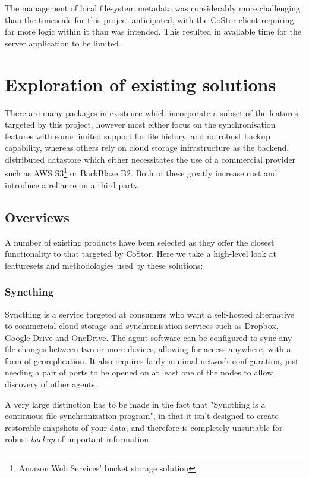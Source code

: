 \documentclass[bsc,frontabs,twoside,singlespacing,parskip,deptreport]{infthesis}     %
\begin{document}
The management of local filesystem metadata was considerably more challenging than the timescale
for this project anticipated, with the CoStor client requiring far more logic within it than was
intended. This resulted in available time for the server application to be limited.

\clearpage

\section{Exploration of existing solutions}

There are many packages in existence which incorporate a subset of the features targeted
by this project, however most either focus on the synchronisation features with some 
limited support for file history, and no robust backup capability, whereas others rely on
cloud storage infrastructure as the backend, distributed datastore which either necessitates
the use of a commercial provider such as AWS S3\footnote{Amazon Web Services' bucket 
storage solution} or BackBlaze B2. Both of these greatly increase cost and introduce a 
reliance on a third party.

\subsection{Overviews}

A number of existing products have been selected as they offer the closest functionality
to that targeted by CoStor. Here we take a high-level look at featuresets and methodologies
used by these solutions:

\subsubsection{Syncthing}

Syncthing is a service targeted at consumers who want a self-hosted alternative to commercial
cloud storage and synchronisation services such as Dropbox, Google Drive and OneDrive. The 
agent software can be configured to sync any file changes between two or more devices, allowing
for access anywhere, with a form of georeplication. It also requires fairly minimal network
configuration, just needing a pair of ports to be opened on at least one of the nodes to allow
discovery of other agents.

A very large distinction has to be made in the fact that "Syncthing is a continuous file 
synchronization program"\cite{syncthing}, in that it isn't designed to create restorable 
snapshots of your data, and therefore is completely unsuitable for robust \textit{backup} of 
important information.
\end{document}

